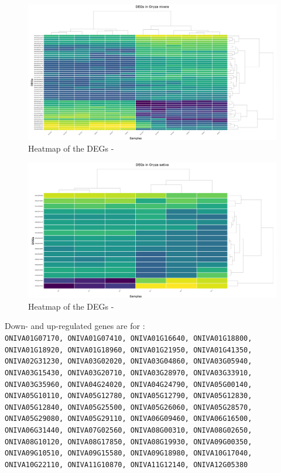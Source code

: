 \begin{figure}[htbp]
    \caption{Heatmap of the DEGs - }
    \label{fig:4.4-DEG-Heatmap-Oryza_nivara}
    \includegraphics[width=\textwidth]{../../results/plots-and-tables/4.4-DEG-Heatmap-Oryza_nivara}
\end{figure}

\begin{figure}[htbp]
    \caption{Heatmap of the DEGs - }
    \label{fig:4.4-DEG-Heatmap-Oryza_sativa}
    \includegraphics[width=\textwidth]{../../results/plots-and-tables/4.4-DEG-Heatmap-Oryza_sativa}
\end{figure}

\filbreak
Down- and up-regulated genes are for :\\
{\scriptsize\texttt{ONIVA01G07170, ONIVA01G07410, ONIVA01G16640, ONIVA01G18800, ONIVA01G18920, ONIVA01G18960, ONIVA01G21950, ONIVA01G41350, ONIVA02G31230, ONIVA03G02020, ONIVA03G04860, ONIVA03G05940, ONIVA03G15430, ONIVA03G20710, ONIVA03G28970, ONIVA03G33910, ONIVA03G35960, ONIVA04G24020, ONIVA04G24790, ONIVA05G00140, ONIVA05G10110, ONIVA05G12780, ONIVA05G12790, ONIVA05G12830, ONIVA05G12840, ONIVA05G25500, ONIVA05G26060, ONIVA05G28570, ONIVA05G29080, ONIVA05G29110, ONIVA06G09460, ONIVA06G16500, ONIVA06G31440, ONIVA07G02560, ONIVA08G00310, ONIVA08G02650, ONIVA08G10120, ONIVA08G17850, ONIVA08G19930, ONIVA09G00350, ONIVA09G10510, ONIVA09G15580, ONIVA09G18980, ONIVA10G17040, ONIVA10G22110, ONIVA11G10870, ONIVA11G12140, ONIVA12G05380
}}

